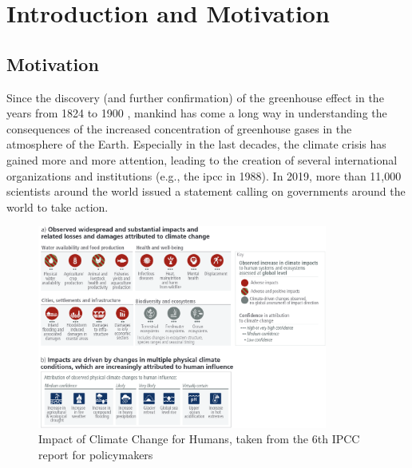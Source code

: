 

\chapter{Introduction and Motivation}
\label{ch:intro}


\section{Motivation}
\label{sec:motivation}


Since the discovery (and further confirmation) of the greenhouse effect in the years from 1824 to 1900 \cite{fourier1824remarques, foote1856circumstances}, mankind has come a long way in understanding the consequences of the increased concentration of greenhouse gases in the atmosphere of the Earth. 
Especially in the last decades, the climate crisis has gained more and more attention, leading to the creation of several international organizations and institutions (e.g., the \ac{ipcc} in 1988).
In 2019, more than 11,000 scientists around the world issued a statement \cite{ripple_world_2019} calling on governments around the world to take action.




\begin{figure}[hbt]
  \begin{center}
    \includegraphics[width=0.85\textwidth]{figures/ipcc_6th_report_impacts_climate_change.png}
  \end{center}
  \caption[IPCC 2014 Climate CHnage Impact]{Impact of Climate Change for Humans, taken from the 6th IPCC report for policymakers \cite{lee2024climate}}
  \label{fig:impacts_climate_change}
\end{figure}




